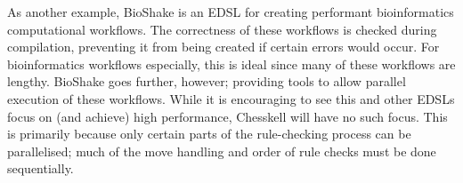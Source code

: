\documentclass[12pt, a4paper, bibliography=totocnumbered]{scrartcl}
\begin{document}
As another example, BioShake \cite{bioshake} is an EDSL for creating performant bioinformatics computational workflows. The correctness of these workflows is checked during compilation, preventing it from being created if certain errors would occur. For bioinformatics workflows especially, this is ideal since many of these workflows are lengthy. BioShake goes further, however; providing tools to allow parallel execution of these workflows. While it is encouraging to see this and other EDSLs \cite{aplite} focus on (and achieve) high performance, Chesskell will have no such focus. This is primarily because only certain parts of the rule-checking process can be parallelised; much of the move handling and order of rule checks must be done sequentially.


\end{document}
